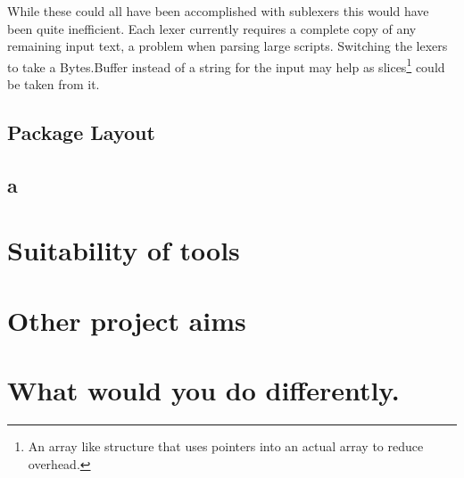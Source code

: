 While these could all have been accomplished with sublexers this would have been quite inefficient. 
Each lexer currently requires a complete copy of any remaining input text, a problem when parsing large scripts. 
Switching the lexers to take a Bytes.Buffer instead of a string for the input may help as slices\footnote{An array like structure that uses pointers into an actual array to reduce overhead.} could be taken from it.


\subsection{Package Layout}

\subsection{a}


\section{Suitability of tools}

\section{Other project aims}

\section{What would you do differently.}













